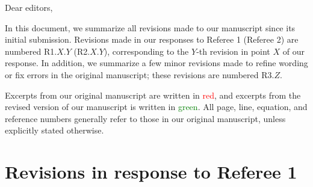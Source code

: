 \documentclass[preprint]{revtex4-1}
\newcommand{\1}{\mathds{1}}
\newcommand{\red}[1]{\textcolor{red}{#1}}
\newcommand{\green}[1]{\textcolor{green}{#1}}
\newcounter{point}
\begin{document}
Dear editors,

In this document, we summarize all revisions made to our manuscript
since its initial submission.  Revisions made in our responses to
Referee 1 (Referee 2) are numbered R1.$X$.$Y$ (R2.$X$.$Y$),
corresponding to the $Y$-th revision in point $X$ of our response.  In
addition, we summarize a few minor revisions made to refine wording or
fix errors in the original manuscript; these revisions are numbered
R3.$Z$.

Excerpts from our original manuscript are written in \red{red}, and
excerpts from the revised version of our manuscript is written in
\green{green}.  All page, line, equation, and reference numbers
generally refer to those in our original manuscript, unless explicitly
stated otherwise.


\section*{Revisions in response to Referee 1}
\end{document}
